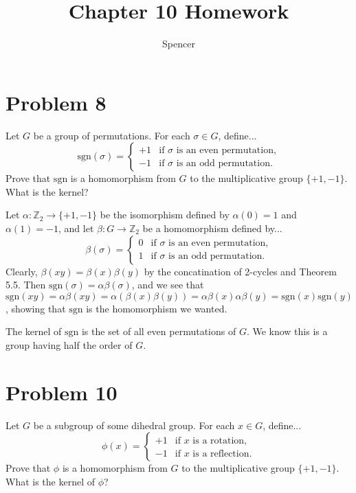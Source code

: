 \documentclass{article}
\title{Chapter 10 Homework}
\author{Spencer}
\begin{document}
\maketitle

\section*{Problem 8}

\newcommand{\sgn}{\mbox{sgn}}
\newcommand{\Z}{\mathbb{Z}}
\newcommand{\lcm}{\mbox{lcm}}

Let $G$ be a group of permutations.  For each $\sigma\in G$, define...
\begin{equation*}
\sgn(\sigma)=\left\{\begin{array}{ll}+1&\mbox{if $\sigma$ is an even permutation,}\\
-1&\mbox{if $\sigma$ is an odd permutation.}\end{array}\right.
\end{equation*}
Prove that $\sgn$ is a homomorphism from $G$ to the multiplicative group $\{+1,-1\}$.
What is the kernel?

Let $\alpha:\Z_2\to\{+1,-1\}$ be the isomorphism defined by $\alpha(0)=1$ and $\alpha(1)=-1$,
and let $\beta:G\to\Z_2$ be a homomorphism defined by...
\begin{equation*}
\beta(\sigma) = \left\{\begin{array}{ll}0&\mbox{if $\sigma$ is an even permutation,}\\
1&\mbox{if $\sigma$ is an odd permutation.}\end{array}\right.
\end{equation*}
Clearly, $\beta(xy)=\beta(x)\beta(y)$ by the concatination of 2-cycles and Theorem 5.5.
Then $\sgn(\sigma)=\alpha\beta(\sigma)$, and we see that
$\sgn(xy)=\alpha\beta(xy)=\alpha(\beta(x)\beta(y))=\alpha\beta(x)\alpha\beta(y)=\sgn(x)\sgn(y)$,
showing that $\sgn$ is the homomorphism we wanted.

The kernel of $\sgn$ is the set of all even permutations of $G$.  We know this is a group
having half the order of $G$.

\section*{Problem 10}

Let $G$ be a subgroup of some dihedral group.  For each $x\in G$, define...
\begin{equation*}
\phi(x)=\left\{\begin{array}{ll}+1&\mbox{if $x$ is a rotation,}\\-1&\mbox{if $x$ is a reflection.}\end{array}\right.
\end{equation*}
Prove that $\phi$ is a homomorphism from $G$ to the multiplicative group $\{+1,-1\}$.
What is the kernel of $\phi$?
\end{document}
